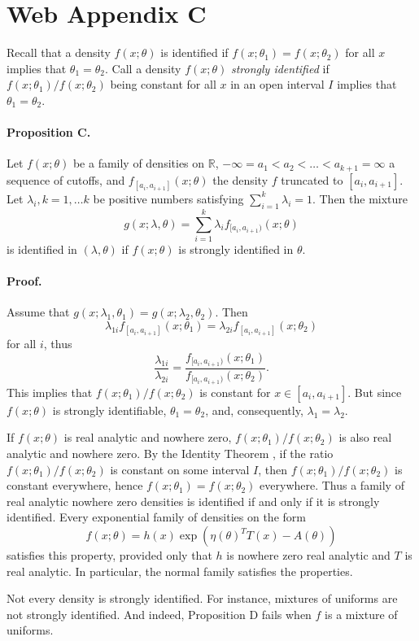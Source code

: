 \documentclass[english]{article}
\begin{document}
\section*{Web Appendix C}

Recall that a density $f(x;\theta)$ is identified if $f(x;\theta_{1})=f(x;\theta_{2})$
for all $x$ implies that $\theta_{1}=\theta_{2}.$ Call a density
$f(x;\theta)$ \textit{strongly identified} if $f(x;\theta_{1})/f(x;\theta_{2})$
being constant for all $x$ in an open interval $I$ implies that
$\theta_{1}=\theta_{2}$.
\paragraph{Proposition C.}\label{prop:identified}

Let $f(x;\theta)$ be a family of densities on $\mathbb{R}$, $-\infty=a_{1}<a_{2}<\ldots<a_{k+1}=\infty$
a sequence of cutoffs, and $f_{[a_{i},a_{i+1}]}(x;\theta)$ the density
$f$ truncated to $[a_{i},a_{i+1}]$. Let $\lambda_{i},k=1,\ldots k$
be positive numbers satisfying $\sum_{i=1}^{k}\lambda_{i}=1$. Then
the mixture
\[
g(x;\lambda,\theta)=\sum_{i=1}^{k}\lambda_{i}f_{[a_{i},a_{i+1})}(x;\theta)
\]
is identified in $(\lambda,\theta)$ if $f(x;\theta)$ is strongly
identified in $\theta$.

\paragraph{Proof.}
Assume that $g(x;\lambda_{1},\theta_{1})=g(x;\lambda_{2},\theta_{2})$.
Then $$\lambda_{1i}f_{[a_{i},a_{i+1}]}(x;\theta_{1})=\lambda_{2i}f_{[a_{i},a_{i+1}]}(x;\theta_{2})$$
for all $i$, thus
\[
\frac{\lambda_{1i}}{\lambda_{2i}}=\frac{f_{[a_{i},a_{i+1})}(x;\theta_{1})}{f_{[a_{i},a_{i+1})}(x;\theta_{2})}.
\]
This implies that $f(x;\theta_{1})/f(x;\theta_{2})$ is constant for
$x\in[a_{i},a_{i+1}]$. But since $f(x;\theta)$ is strongly identifiable,
$\theta_{1}=\theta_{2}$, and, consequently, $\lambda_1 = \lambda_2$.


If $f(x;\theta)$ is real analytic and nowhere zero, $f(x;\theta_{1})/f(x;\theta_{2})$
is also real analytic and nowhere zero. By the Identity Theorem \citep[Corollary 1.2.6]{Krantz2002-bt}, if the ratio
$f(x;\theta_{1})/f(x;\theta_{2})$ is constant on some interval $I$,
then $f(x;\theta_{1})/f(x;\theta_{2})$ is constant everywhere, hence
$f(x;\theta_{1})=f(x;\theta_{2})$ everywhere. Thus a family of real
analytic nowhere zero densities is identified if and only if it is
strongly identified. Every exponential family of densities on the form
\[
f(x;\theta)=h(x)\exp(\eta(\theta)^{T}T(x)-A(\theta))
\]
satisfies this property, provided only that $h$ is nowhere zero real analytic
and $T$ is real analytic. In particular, the normal family satisfies
the properties.

Not every density is strongly identified. For instance, mixtures of uniforms are not strongly identified. And indeed, Proposition D fails when $f$ is a mixture of uniforms.



\end{document}
